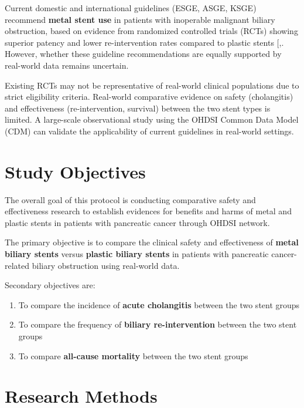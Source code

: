 \documentclass[
  12pt,
]{article}
\providecommand{\tightlist}{%
  \setlength{\itemsep}{0pt}\setlength{\parskip}{0pt}}
\begin{document}
Current domestic and international guidelines (ESGE, ASGE, KSGE) recommend \textbf{metal stent use} in patients with inoperable malignant biliary obstruction, based on evidence from randomized controlled trials (RCTs) showing superior patency and lower re-intervention rates compared to plastic stents {[},\citeproc{ref-Almadi2013}{2}{]}. However, whether these guideline recommendations are equally supported by real-world data remains uncertain.

Existing RCTs may not be representative of real-world clinical populations due to strict eligibility criteria. Real-world comparative evidence on safety (cholangitis) and effectiveness (re-intervention, survival) between the two stent types is limited. A large-scale observational study using the OHDSI Common Data Model (CDM) can validate the applicability of current guidelines in real-world settings.

\section{Study Objectives}\label{study-objectives}

The overall goal of this protocol is conducting comparative safety and effectiveness research to establish evidences for benefits and harms of metal and plastic stents in patients with pancreatic cancer through OHDSI network.

The primary objective is to compare the clinical safety and effectiveness of \textbf{metal biliary stents} versus \textbf{plastic biliary stents} in patients with pancreatic cancer-related biliary obstruction using real-world data.

Secondary objectives are:

\begin{enumerate}
\def\labelenumi{\arabic{enumi}.}
\tightlist
\item
  To compare the incidence of \textbf{acute cholangitis} between the two stent groups
\item
  To compare the frequency of \textbf{biliary re-intervention} between the two stent groups
\item
  To compare \textbf{all-cause mortality} between the two stent groups
\end{enumerate}

\section{Research Methods}\label{research-methods}
\end{document}
